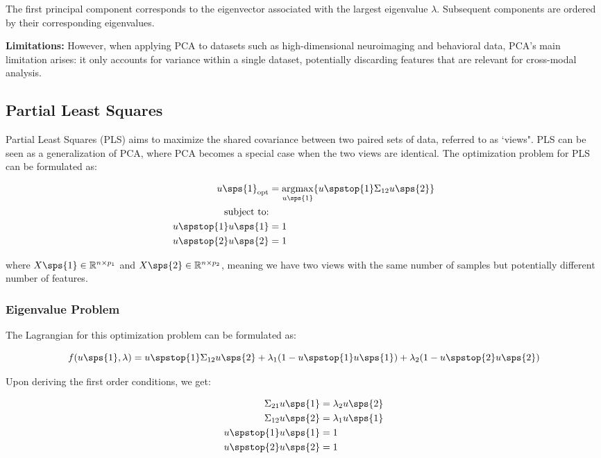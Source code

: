The first principal component corresponds to the eigenvector associated with the largest eigenvalue \(\lambda\). Subsequent components are ordered by their corresponding eigenvalues.

\textbf{Limitations: }However, when applying PCA to datasets such as high-dimensional neuroimaging and behavioral
data, PCA's main limitation arises: it only accounts for variance within a single dataset, potentially discarding features that are relevant for cross-modal analysis.

\subsection{Partial Least Squares}

Partial Least Squares (PLS)\citep{wold1975path} aims to maximize the shared covariance between two paired sets of data, referred to as `views". PLS can be seen as a generalization of PCA, where PCA becomes a special case when the two views are identical. The optimization problem for PLS can be formulated as:

\begin{align}
     u\sps{1}_{\text{opt}} &= \underset{u\sps{1}}{\mathrm{argmax}} \{ u\spstop{1} \Sigma_{12} u\sps{2} \} \\
     \text{subject to:} \notag \\
     u\spstop{1}u\sps{1} &= 1 \notag \\
     u\spstop{2}u\sps{2} &= 1 \notag
\end{align}

where \( X\sps{1} \in \mathbb{R}^{n \times p_1} \) and \( X\sps{2} \in \mathbb{R}^{n \times p_2} \), meaning we have two views with the same number of samples but potentially different number of features.

\subsubsection{Eigenvalue Problem}

The Lagrangian for this optimization problem can be formulated as:

\begin{equation}
f(u\sps{1}, \lambda) = u\spstop{1} \Sigma_{12} u\sps{2} + \lambda_1 (1 - u\spstop{1}u\sps{1}) + \lambda_2 (1 - u\spstop{2}u\sps{2})
\end{equation}

Upon deriving the first order conditions, we get:

\begin{align}
    \Sigma_{21} u\sps{1} &= \lambda_2 u\sps{2} \\
    \Sigma_{12} u\sps{2} &= \lambda_1 u\sps{1} \\
    u\spstop{1}u\sps{1} &= 1 \\
    u\spstop{2}u\sps{2} &= 1
\end{align}


